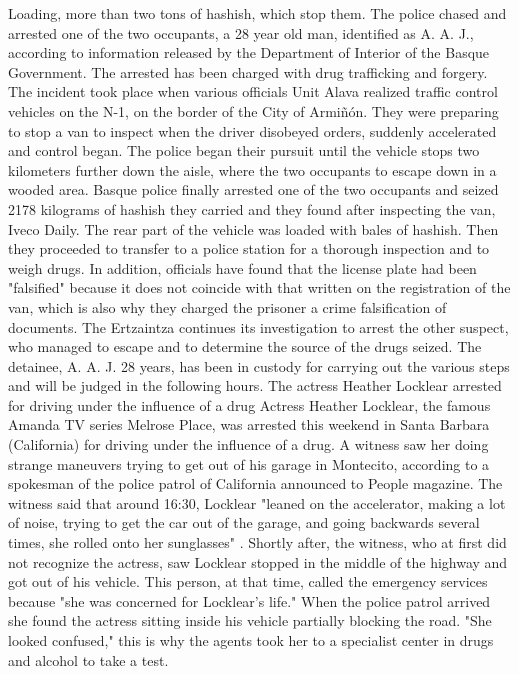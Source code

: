 Loading, more than two tons of hashish, which stop them.
The police chased and arrested one of the two occupants, a 28 year old man, identified as A. A. J., according to information released by the Department of Interior of the Basque Government.
The arrested has been charged with drug trafficking and forgery.
The incident took place when various officials Unit Alava realized traffic control vehicles on the N-1, on the border of the City of Armiñón.
They were preparing to stop a van to inspect when the driver disobeyed orders, suddenly accelerated and control began.
The police began their pursuit until the vehicle stops two kilometers further down the aisle, where the two occupants to escape down in a wooded area.
Basque police finally arrested one of the two occupants and seized 2178 kilograms of hashish they carried and they found after inspecting the van, Iveco Daily.
The rear part of the vehicle was loaded with bales of hashish. Then they proceeded to transfer to a police station for a thorough inspection and to weigh drugs.
In addition, officials have found that the license plate had been "falsified" because it does not coincide with that written on the registration of the van, which is also why they charged the prisoner a crime falsification of documents.
The Ertzaintza continues its investigation to arrest the other suspect, who managed to escape and to determine the source of the drugs seized.
The detainee, A. A. J. 28 years, has been in custody for carrying out the various steps and will be judged in the following hours.
The actress Heather Locklear arrested for driving under the influence of a drug
Actress Heather Locklear, the famous Amanda TV series Melrose Place, was arrested this weekend in Santa Barbara (California) for driving under the influence of a drug.
A witness saw her doing strange maneuvers trying to get out of his garage in Montecito, according to a spokesman of the police patrol of California announced to People magazine.
The witness said that around 16:30, Locklear "leaned on the accelerator, making a lot of noise, trying to get the car out of the garage, and going backwards several times, she rolled onto her sunglasses" .
Shortly after, the witness, who at first did not recognize the actress, saw Locklear stopped in the middle of the highway and got out of his vehicle.
This person, at that time, called the emergency services because "she was concerned for Locklear's life."
When the police patrol arrived she found the actress sitting inside his vehicle partially blocking the road.
"She looked confused," this is why the agents took her to a specialist center in drugs and alcohol to take a test.
